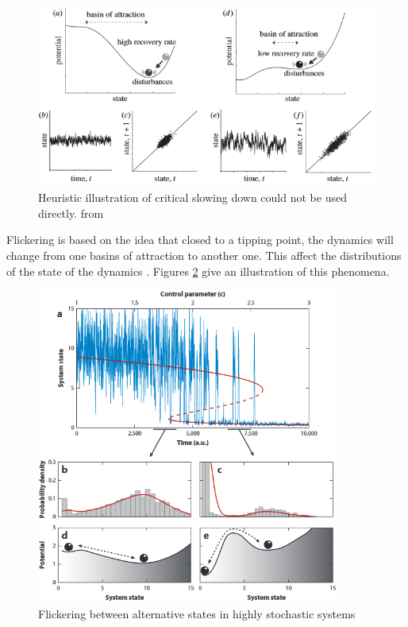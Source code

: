 \documentclass{article}
\begin{document}
\begin{figure}[h]
\begin{center}
\includegraphics[width=12cm]{slowing_down.png}
\end{center}
\caption{\label{fig:temp}Heuristic illustration of critical slowing down could not be used directly. from \cite{lenton_early_2012}}
\end{figure}

Flickering is based on the idea that closed to a tipping point, the dynamics will change from one basins of attraction to another one. This affect the distributions of the state of the dynamics \citep{carr_modeling_2012, wang_flickering_2012, dakos_flickering_2013, scheffer_anticipating_2012}. Figures \ref{flickering} give an illustration of this phenomena.


\begin{figure}[h]
\begin{center}
\includegraphics[width=10cm]{flickering.png}
\end{center}
\caption{\label{fig:temp}Flickering between alternative states in highly stochastic systems \citep{scheffer_anticipating_2012}}
\label{flickering}
\end{figure}
\end{document}
